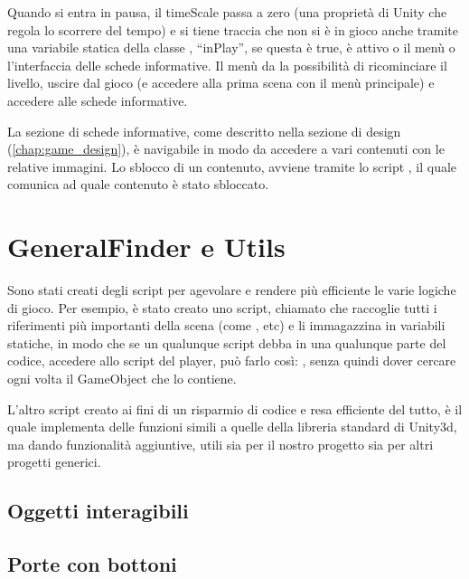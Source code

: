 Quando si entra in pausa, il timeScale passa a zero (una proprietà di Unity che regola lo scorrere del tempo) e si tiene traccia che non si è in gioco anche tramite una variabile statica della classe , ``inPlay'', se questa è true, è attivo o il menù o l'interfaccia delle schede informative.
Il menù da la possibilità di ricominciare il livello, uscire dal gioco (e accedere alla prima scena con il menù principale) e accedere alle schede informative. 

La sezione di schede informative, come descritto nella sezione di design (\ref{chap:game_design}), è navigabile in modo da accedere a vari contenuti con le relative immagini. Lo sblocco di un contenuto, avviene tramite lo script , il quale comunica ad  quale contenuto è stato sbloccato.

\section{GeneralFinder e Utils}

Sono stati creati degli script per agevolare e rendere più efficiente le varie logiche di gioco. Per esempio, è stato creato uno script, chiamato  che raccoglie tutti i riferimenti più importanti della scena (come ,  etc) e li immagazzina in variabili statiche, in modo che se un qualunque script debba in una qualunque parte del codice, accedere allo script del player, può farlo così: , senza quindi dover cercare ogni volta il GameObject che lo contiene.

L'altro script creato ai fini di un risparmio di codice e resa efficiente del tutto, è  il quale implementa delle funzioni simili a quelle della libreria standard di Unity3d, ma dando funzionalità aggiuntive, utili sia per il nostro progetto sia per altri progetti generici.

\subsection{Oggetti interagibili}

\subsection{Porte con bottoni}

